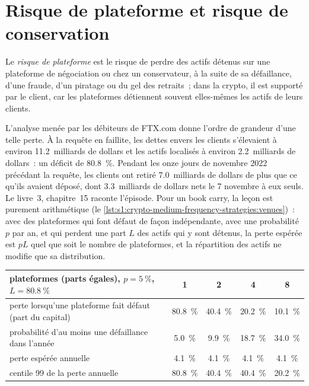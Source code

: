 \section{Risque de plateforme et risque de conservation}

\begin{definition}\label{def:s1:crypto-medium-frequency-strategies:venue}
Le \emph{risque de plateforme} est le risque de perdre des actifs détenus sur une plateforme de négociation ou chez un conservateur, à la suite de sa défaillance, d'une fraude, d'un piratage ou du gel des
retraits~; dans la crypto, il est supporté par le client, car les plateformes détiennent souvent elles-mêmes les actifs de leurs clients.
\end{definition}

L'analyse menée par les débiteurs de FTX.com donne l'ordre de grandeur d'une telle perte. À la requête en faillite, les dettes envers les clients s'élevaient à environ 11.2~milliards de dollars et les actifs localisés à
environ 2.2~milliards de dollars~: un déficit de 80.8~\%. Pendant les onze jours de novembre 2022 précédant la requête, les clients ont retiré 7.0~milliards de dollars de plus que
ce qu'ils avaient déposé, dont 3.3~milliards de dollars nets le 7 novembre à eux seuls. Le livre~3, chapitre~15 raconte l'épisode. Pour un book carry, la leçon est purement arithmétique
(le \cref{lst:s1:crypto-medium-frequency-strategies:venues})~: avec des plateformes qui font défaut de façon indépendante, avec une probabilité $p$ par an, et qui perdent une part $L$ des
actifs qui y sont détenus, la perte espérée est $pL$ quel que soit le nombre de plateformes, et la répartition des actifs ne modifie que sa distribution.

\begin{center}
\small
\begin{tabular}{@{}lcccc@{}}
\toprule
plateformes (parts égales), $p = 5~\%$, $L = 80.8~\%$ & 1 & 2 & 4 & 8\\
\midrule
perte lorsqu'une plateforme fait défaut (part du capital) & 80.8~\% & 40.4~\% & 20.2~\% & 10.1~\%\\
probabilité d'au moins une défaillance dans l'année & 5.0~\% & 9.9~\% & 18.7~\% & 34.0~\%\\
perte espérée annuelle & 4.1~\% & 4.1~\% & 4.1~\% & 4.1~\%\\
centile 99 de la perte annuelle & 80.8~\% & 40.4~\% & 40.4~\% & 20.2~\%\\
\bottomrule
\end{tabular}
\end{center}

